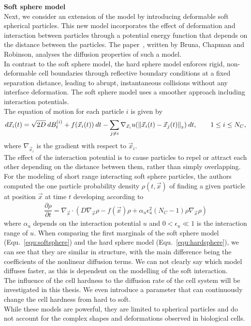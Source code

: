 \textbf{Soft sphere model} \\
Next, we consider an extension of the model by introducing deformable soft spherical particles. 
This new model incorporates the effect of deformation and interaction between particles through a potential energy function that depends on the distance between the particles.
The paper~\cite{Bruna2017}, written by Bruna, Chapman and Robinson, analyses the diffusion properties of such a model. \\
In contrast to the soft sphere model, the hard sphere model enforces rigid, non-deformable cell boundaries through reflective boundary conditions at a fixed separation distance, leading to abrupt, instantaneous collisions without any interface deformation. 
The soft sphere model uses a smoother approach including interaction potentials. \\
The equation of motion for each particle $i$ is given by
\begin{align*}
	d\vec{x}_i(t) = \sqrt{2D} \: dB_t^{(i)} + f(\vec{x}_i(t))\: dt - \sum\limits_{j\neq i} \nabla_{\vec{x}_i} u (\norm[ \vec{x}_i(t) - \vec{x}_j(t)]) \: dt, \qquad 1 \leq i \leq N_C,
\end{align*}
where $\nabla_{\vec{x}_i}$ is the gradient with respect to $\vec{x}_i$. \\
The effect of the interaction potential is to cause particles to repel or attract each other depending on the distance between them, rather than simply overlapping. \\
For the modeling of short range interacting soft sphere particles, the authors computed the one particle probability density $\rho(t, \vec{x})$ of finding a given particle at position $\vec{x}$ at time $t$ developing according to
\begin{align}
	\dfrac{\partial \rho}{\partial t} = \nabla_{\vec{x}} \cdot (D \nabla_{\vec{x}} \rho - f(\vec{x}) \rho + \alpha_u \epsilon_u^2(N_C-1)\rho \nabla_{\vec{x}} \rho)
	\label{equ:softsphere}
\end{align}
where $\alpha_u$ depends on the interaction potential $u$ and $0 < \epsilon_u \ll 1$ is the interaction range of $u$.
When comparing the first marginals of the soft sphere model (Equ.~\eqref{equ:softsphere}) and the hard sphere model (Equ.~\eqref{equ:hardsphere}), we can see that they are similar in structure, with the main difference being the coefficients of the nonlinear diffusion terms. 
We can not clearly say which model diffuses faster, as this is dependent on the modelling of the soft interaction. \\
The influence of the cell hardness to the diffusion rate of the cell system will be investigated in this thesis. 
We even introduce a parameter that can continuously change the cell hardness from hard to soft. \\
While these models are powerful, they are limited to spherical particles and do not account for the complex shapes and deformations observed in biological cells.  \\




